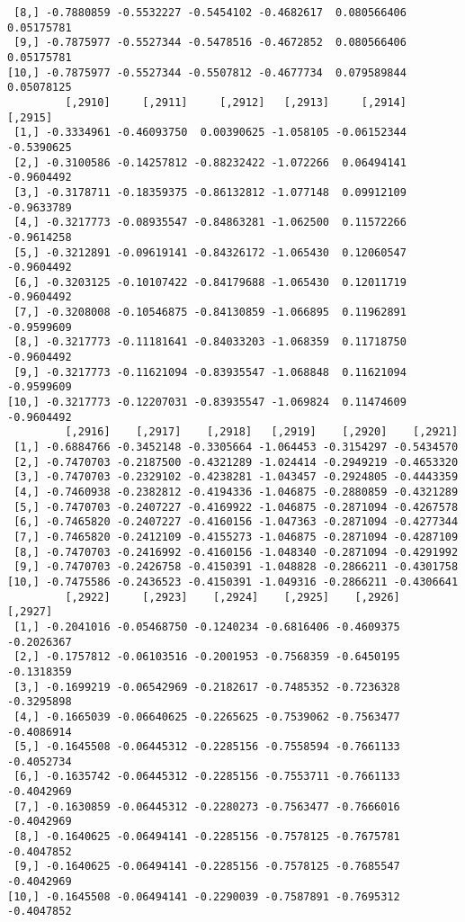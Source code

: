 \documentclass[
  letterpaper,
  DIV=11,
  numbers=noendperiod]{scrreprt}
\begin{document}
\begin{verbatim}
 [8,] -0.7880859 -0.5532227 -0.5454102 -0.4682617  0.080566406  0.05175781
 [9,] -0.7875977 -0.5527344 -0.5478516 -0.4672852  0.080566406  0.05175781
[10,] -0.7875977 -0.5527344 -0.5507812 -0.4677734  0.079589844  0.05078125
         [,2910]     [,2911]     [,2912]   [,2913]     [,2914]    [,2915]
 [1,] -0.3334961 -0.46093750  0.00390625 -1.058105 -0.06152344 -0.5390625
 [2,] -0.3100586 -0.14257812 -0.88232422 -1.072266  0.06494141 -0.9604492
 [3,] -0.3178711 -0.18359375 -0.86132812 -1.077148  0.09912109 -0.9633789
 [4,] -0.3217773 -0.08935547 -0.84863281 -1.062500  0.11572266 -0.9614258
 [5,] -0.3212891 -0.09619141 -0.84326172 -1.065430  0.12060547 -0.9604492
 [6,] -0.3203125 -0.10107422 -0.84179688 -1.065430  0.12011719 -0.9604492
 [7,] -0.3208008 -0.10546875 -0.84130859 -1.066895  0.11962891 -0.9599609
 [8,] -0.3217773 -0.11181641 -0.84033203 -1.068359  0.11718750 -0.9604492
 [9,] -0.3217773 -0.11621094 -0.83935547 -1.068848  0.11621094 -0.9599609
[10,] -0.3217773 -0.12207031 -0.83935547 -1.069824  0.11474609 -0.9604492
         [,2916]    [,2917]    [,2918]   [,2919]    [,2920]    [,2921]
 [1,] -0.6884766 -0.3452148 -0.3305664 -1.064453 -0.3154297 -0.5434570
 [2,] -0.7470703 -0.2187500 -0.4321289 -1.024414 -0.2949219 -0.4653320
 [3,] -0.7470703 -0.2329102 -0.4238281 -1.043457 -0.2924805 -0.4443359
 [4,] -0.7460938 -0.2382812 -0.4194336 -1.046875 -0.2880859 -0.4321289
 [5,] -0.7470703 -0.2407227 -0.4169922 -1.046875 -0.2871094 -0.4267578
 [6,] -0.7465820 -0.2407227 -0.4160156 -1.047363 -0.2871094 -0.4277344
 [7,] -0.7465820 -0.2412109 -0.4155273 -1.046875 -0.2871094 -0.4287109
 [8,] -0.7470703 -0.2416992 -0.4160156 -1.048340 -0.2871094 -0.4291992
 [9,] -0.7470703 -0.2426758 -0.4150391 -1.048828 -0.2866211 -0.4301758
[10,] -0.7475586 -0.2436523 -0.4150391 -1.049316 -0.2866211 -0.4306641
         [,2922]     [,2923]    [,2924]    [,2925]    [,2926]    [,2927]
 [1,] -0.2041016 -0.05468750 -0.1240234 -0.6816406 -0.4609375 -0.2026367
 [2,] -0.1757812 -0.06103516 -0.2001953 -0.7568359 -0.6450195 -0.1318359
 [3,] -0.1699219 -0.06542969 -0.2182617 -0.7485352 -0.7236328 -0.3295898
 [4,] -0.1665039 -0.06640625 -0.2265625 -0.7539062 -0.7563477 -0.4086914
 [5,] -0.1645508 -0.06445312 -0.2285156 -0.7558594 -0.7661133 -0.4052734
 [6,] -0.1635742 -0.06445312 -0.2285156 -0.7553711 -0.7661133 -0.4042969
 [7,] -0.1630859 -0.06445312 -0.2280273 -0.7563477 -0.7666016 -0.4042969
 [8,] -0.1640625 -0.06494141 -0.2285156 -0.7578125 -0.7675781 -0.4047852
 [9,] -0.1640625 -0.06494141 -0.2285156 -0.7578125 -0.7685547 -0.4042969
[10,] -0.1645508 -0.06494141 -0.2290039 -0.7587891 -0.7695312 -0.4047852

\end{verbatim}
\end{document}
